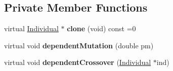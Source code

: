 \subsection*{Private Member Functions}
\begin{DoxyCompactItemize}
\item 
\mbox{\label{classIndividual_af4553d2ba5e943258c1389735d5caa87}} 
virtual \mbox{\hyperlink{classIndividual}{Individual}} $\ast$ {\bfseries clone} (void) const =0
\item 
\mbox{\label{classIndividual_afa6573583c7cebb4a71c09d8e0639048}} 
virtual void {\bfseries dependent\+Mutation} (double pm)
\item 
\mbox{\label{classIndividual_acddee962ce99dcba006c0111c65b26e1}} 
virtual void {\bfseries dependent\+Crossover} (\mbox{\hyperlink{classIndividual}{Individual}} $\ast$ind)
\end{DoxyCompactItemize}

